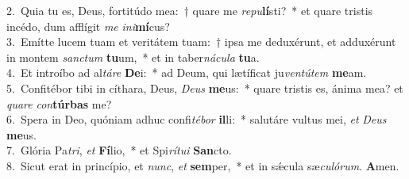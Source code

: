 {2.~}Quia tu es, Deus, fortitúdo mea:~† quare me \textit{re}\textit{pu}\textbf{lí}sti?~* et quare tristis incédo, dum afflígit \textit{me} \textit{i}\textit{ni}\textbf{mí}cus?\\
{3.~}Emítte lucem tuam et veritátem tuam:~† ipsa me deduxérunt, et adduxérunt in montem \textit{san}\textit{ctum} \textbf{tu}um,~* et in taber\textit{ná}\textit{cu}\textit{la} \textbf{tu}a.\\
{4.~}Et introíbo ad al\textit{tá}\textit{re} \textbf{De}i:~* ad Deum, qui lætíficat ju\textit{ven}\textit{tú}\textit{tem} \textbf{me}am.\\
{5.~}Confitébor tibi in cíthara, Deus, \textit{De}\textit{us} \textbf{me}us:~* quare tristis es, ánima mea? et \textit{qua}\textit{re} \textit{con}\textbf{túr}\textbf{bas} me?\\
{6.~}Spera in Deo, quóniam adhuc confi\textit{té}\textit{bor} \textbf{il}li:~* salutáre vultus mei, \textit{et} \textit{De}\textit{us} \textbf{me}us.\\
{7.~}Glória Pa\textit{tri}, \textit{et} \textbf{Fí}lio,~* et Spi\textit{rí}\textit{tu}\textit{i} \textbf{San}cto.\\
{8.~}Sicut erat in princípio, et \textit{nunc}, \textit{et} \textbf{sem}per,~* et in sǽcula sæ\textit{cu}\textit{ló}\textit{rum}. \textbf{A}men.\\
